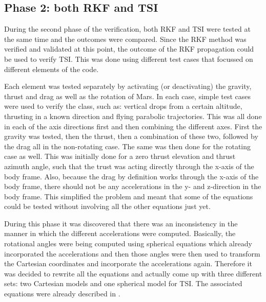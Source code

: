 \subsection{Phase 2: both \ac{RKF} and \ac{TSI}}
\label{subsec:phase2com}
During the second phase of the verification, both \ac{RKF} and \ac{TSI} were tested at the same time and the outcomes were compared. Since the \ac{RKF} method was verified and validated at this point, the outcome of the \ac{RKF} propagation could be used to verify \ac{TSI}. This was done using different test cases that focussed on different elements of the code. 

Each element was tested separately by activating (or deactivating) the gravity, thrust and drag as well as the rotation of Mars. In each case, simple test cases were used to verify the class, such as: vertical drops from a certain altitude, thrusting in a known direction and flying parabolic trajectories. This was all done in each of the axis directions first and then combining the different axes. First the gravity was tested, then the thrust, then a combination of these two, followed by the drag all in the non-rotating case. The same was then done for the rotating case as well. This was initially done for a zero thrust elevation and thrust azimuth angle, such that the trust was acting directly through the x-axis of the body frame. Also, because the drag by definition works through the x-axis of the body frame, there should not be any accelerations in the y- and z-direction in the body frame. This simplified the problem and meant that some of the equations could be tested without involving all the other equations just yet. 

During this phase it was discovered that there was an inconsistency in the manner in which the different accelerations were computed. Basically, the rotational angles were being computed using spherical equations which already incorporated the accelerations and then those angles were then used to transform the Cartesian coordinates and incorporate the accelerations again. Therefore it was decided to rewrite all the equations and actually come up with three different sets: two Cartesian models and one spherical model for \ac{TSI}. The associated equations were already described in .

